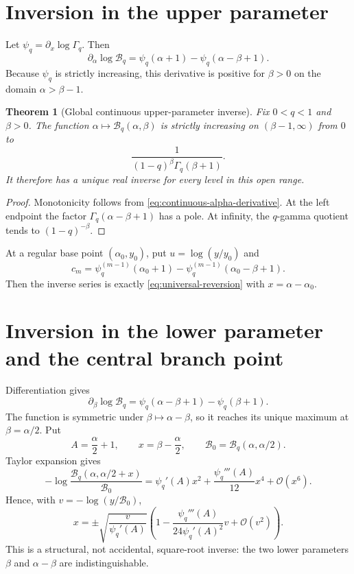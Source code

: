 \documentclass[11pt,oneside]{book}
\newtheorem{theorem}{Theorem}[chapter]
\theoremstyle{definition}
\theoremstyle{remark}
\newcommand{\OO}{\mathcal{O}}
\begin{document}
\section{Inversion in the upper parameter}
Let $\psi_q=\partial_x\log\Gamma_q$.  Then
\begin{equation}\label{eq:continuous-alpha-derivative}
 \partial_\alpha\log\mathcal B_q
 =\psi_q(\alpha+1)-\psi_q(\alpha-\beta+1).
\end{equation}
Because $\psi_q$ is strictly increasing, this derivative is positive for
$\beta>0$ on the domain $\alpha>\beta-1$.

\begin{theorem}[Global continuous upper-parameter inverse]
Fix $0<q<1$ and $\beta>0$.  The function
$\alpha\mapsto\mathcal B_q(\alpha,\beta)$ is strictly increasing on
$(\beta-1,\infty)$ from $0$ to
\begin{equation}\label{eq:continuous-upper-limit}
 \frac{1}{(1-q)^\beta\Gamma_q(\beta+1)}.
\end{equation}
It therefore has a unique real inverse for every level in this open range.
\end{theorem}
\begin{proof}
Monotonicity follows from \eqref{eq:continuous-alpha-derivative}.  At the left
endpoint the factor $\Gamma_q(\alpha-\beta+1)$ has a pole.  At infinity, the
$q$-gamma quotient tends to $(1-q)^{-\beta}$.
\end{proof}

At a regular base point $(\alpha_0,y_0)$, put
$u=\log(y/y_0)$ and
\[
 c_m=\psi_q^{(m-1)}(\alpha_0+1)
      -\psi_q^{(m-1)}(\alpha_0-\beta+1).
\]
Then the inverse series is exactly \eqref{eq:universal-reversion} with
$x=\alpha-\alpha_0$.

\section{Inversion in the lower parameter and the central branch point}
Differentiation gives
\begin{equation}\label{eq:continuous-beta-derivative}
 \partial_\beta\log\mathcal B_q
 =\psi_q(\alpha-\beta+1)-\psi_q(\beta+1).
\end{equation}
The function is symmetric under $\beta\mapsto\alpha-\beta$, so it reaches its
unique maximum at $\beta=\alpha/2$.  Put
\[
 A=\frac\alpha2+1,
 \qquad x=\beta-\frac\alpha2,
 \qquad \mathcal B_0=\mathcal B_q(\alpha,\alpha/2).
\]
Taylor expansion gives
\begin{equation}\label{eq:beta-center-direct}
 -\log\frac{\mathcal B_q(\alpha,\alpha/2+x)}{\mathcal B_0}
 =\psi_q'(A)x^2+\frac{\psi_q'''(A)}{12}x^4+\OO(x^6).
\end{equation}
Hence, with $v=-\log(y/\mathcal B_0)$,
\begin{equation}\label{eq:beta-center-inverse}
 x=\pm\sqrt{\frac{v}{\psi_q'(A)}}
 \left(1-\frac{\psi_q'''(A)}{24\psi_q'(A)^2}v
 +\OO(v^2)\right).
\end{equation}
This is a structural, not accidental, square-root inverse: the two lower
parameters $\beta$ and $\alpha-\beta$ are indistinguishable.
\end{document}
